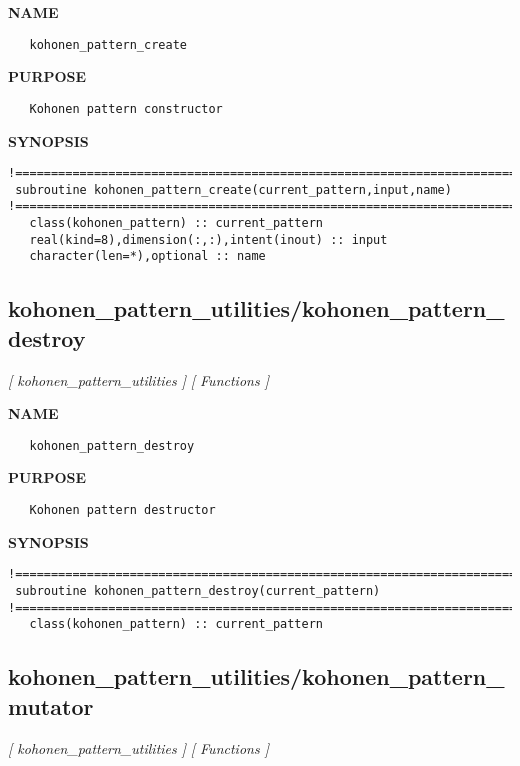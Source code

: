 \documentclass{article}
\begin{document}
\label{ch:robo25}
\label{ch:kohonen_pattern_utilities_kohonen_pattern_create}
\textbf{NAME}
\begin{verbatim}
   kohonen_pattern_create
\end{verbatim}
\textbf{PURPOSE}
\begin{verbatim}
   Kohonen pattern constructor
\end{verbatim}
\textbf{SYNOPSIS}
\begin{verbatim}
!========================================================================================
 subroutine kohonen_pattern_create(current_pattern,input,name)
!========================================================================================
   class(kohonen_pattern) :: current_pattern
   real(kind=8),dimension(:,:),intent(inout) :: input
   character(len=*),optional :: name
\end{verbatim}
\newpage
\subsection{kohonen\_pattern\_utilities/kohonen\_pattern\_destroy}
\textsl{[ kohonen\_pattern\_utilities ]}
\textsl{[ Functions ]}

\label{ch:robo26}
\label{ch:kohonen_pattern_utilities_kohonen_pattern_destroy}
\textbf{NAME}
\begin{verbatim}
   kohonen_pattern_destroy
\end{verbatim}
\textbf{PURPOSE}
\begin{verbatim}
   Kohonen pattern destructor
\end{verbatim}
\textbf{SYNOPSIS}
\begin{verbatim}
!========================================================================================
 subroutine kohonen_pattern_destroy(current_pattern)
!========================================================================================
   class(kohonen_pattern) :: current_pattern
\end{verbatim}
\newpage
\subsection{kohonen\_pattern\_utilities/kohonen\_pattern\_mutator}
\textsl{[ kohonen\_pattern\_utilities ]}
\textsl{[ Functions ]}
\end{document}
